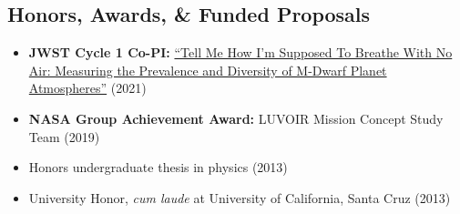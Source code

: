 \documentclass[margin,10pt]{res}
\begin{document}
\begin{resume}
\section{Honors, Awards, \& Funded Proposals}
                 \begin{itemize}  \itemsep -1pt %
                    \item \textbf{JWST Cycle 1 Co-PI:} \href{https://www.stsci.edu/jwst/science-execution/program-information?id=1981}{``Tell Me How I'm Supposed To Breathe With No Air: Measuring the Prevalence and Diversity of M-Dwarf Planet Atmospheres''} (2021)
                    \item \textbf{NASA Group Achievement Award:} LUVOIR Mission Concept Study Team (2019)
                    \item Honors undergraduate thesis in physics (2013)
                    \item University Honor, \textit{cum laude} at University of California, Santa Cruz (2013)\\
                 \end{itemize}  


\end{resume}
\end{document}
